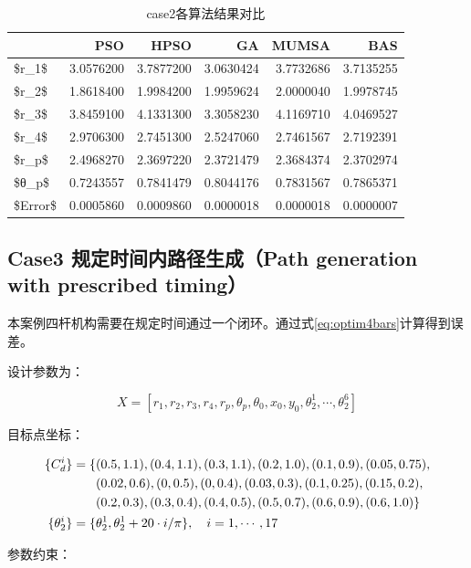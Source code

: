 \documentclass[]{ctexbook}
\theoremstyle{definition}
\theoremstyle{definition}
\theoremstyle{definition}
\theoremstyle{remark}
\begin{document}
\begin{table}

\caption{\label{tab:case2table}case2各算法结果对比}
\centering
\begin{tabular}[t]{lrrrrr}
\toprule
  & PSO & HPSO & GA & MUMSA & BAS\\
\midrule
\$r\_1\$ & 3.0576200 & 3.7877200 & 3.0630424 & 3.7732686 & 3.7135255\\
\$r\_2\$ & 1.8618400 & 1.9984200 & 1.9959624 & 2.0000040 & 1.9978745\\
\$r\_3\$ & 3.8459100 & 4.1331300 & 3.3058230 & 4.1169710 & 4.0469527\\
\$r\_4\$ & 2.9706300 & 2.7451300 & 2.5247060 & 2.7461567 & 2.7192391\\
\$r\_p\$ & 2.4968270 & 2.3697220 & 2.3721479 & 2.3684374 & 2.3702974\\
\addlinespace
\$θ\_p\$ & 0.7243557 & 0.7841479 & 0.8044176 & 0.7831567 & 0.7865371\\
\$Error\$ & 0.0005860 & 0.0009860 & 0.0000018 & 0.0000018 & 0.0000007\\
\bottomrule
\end{tabular}
\end{table}

\subsection{Case3 规定时间内路径生成（Path generation with prescribed
timing）}\label{case3-path-generation-with-prescribed-timing}

本案例四杆机构需要在规定时间通过一个闭环。通过式\eqref{eq:optim4bars}计算得到误差。

设计参数为：

\[
X = [r_1,r_2,r_3,r_4,r_p,\theta_p,\theta_0,x_0,y_0,\theta_2^1,\cdots,\theta_2^6]
\]

目标点坐标：

\begin{align}
\{C_d^i\} = \{&(0.5,1.1),(0.4,1.1),(0.3,1.1),(0.2,1.0),(0.1,0.9),(0.05,0.75), \notag \\
&(0.02,0.6),(0,0.5),(0,0.4),(0.03,0.3),(0.1,0.25),(0.15,0.2), \notag\\
&(0.2,0.3),(0.3,0.4),(0.4,0.5),(0.5,0.7),(0.6,0.9),(0.6,1.0)\} \notag\\
\{\theta_2^i\}=\{&\theta_2^1,\theta_2^1+20\cdot i/\pi\},\quad i = 1,\cdots,17 \notag \\
\end{align}

参数约束：
\end{document}

